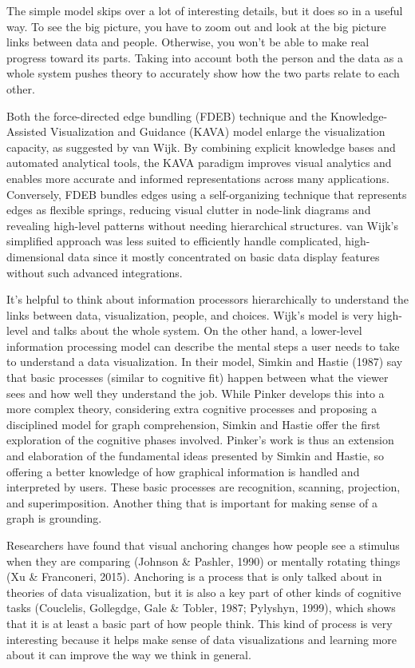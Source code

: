 \documentclass[print]{nuthesis}
\begin{document}
The simple model skips over a lot of interesting details, but it does so in a useful way.
To see the big picture, you have to zoom out and look at the big picture links between data and people.
Otherwise, you won't be able to make real progress toward its parts. Taking into account both the person and the data as a whole system pushes theory to accurately show how the two parts relate to each other.

Both the force-directed edge bundling (FDEB) technique and the Knowledge-Assisted Visualization and Guidance (KAVA) model enlarge the visualization capacity, as suggested by van Wijk.
By combining explicit knowledge bases and automated analytical tools, the KAVA paradigm improves visual analytics and enables more accurate and informed representations across many applications.
Conversely, FDEB bundles edges using a self-organizing technique that represents edges as flexible springs, reducing visual clutter in node-link diagrams and revealing high-level patterns without needing hierarchical structures.
van Wijk's simplified approach was less suited to efficiently handle complicated, high-dimensional data since it mostly concentrated on basic data display features without such advanced integrations.

It's helpful to think about information processors hierarchically to understand the links between data, visualization, people, and choices.
Wijk's model is very high-level and talks about the whole system. On the other hand, a lower-level information processing model can describe the mental steps a user needs to take to understand a data visualization.
In their model, Simkin and Hastie (1987) say that basic processes (similar to cognitive fit) happen between what the viewer sees and how well they understand the job.
While Pinker develops this into a more complex theory, considering extra cognitive processes and proposing a disciplined model for graph comprehension, Simkin and Hastie offer the first exploration of the cognitive phases involved. Pinker's work is thus an extension and elaboration of the fundamental ideas presented by Simkin and Hastie, so offering a better knowledge of how graphical information is handled and interpreted by users.
These basic processes are recognition, scanning, projection, and superimposition. Another thing that is important for making sense of a graph is grounding.

Researchers have found that visual anchoring changes how people see a stimulus when they are comparing (Johnson \& Pashler, 1990) or mentally rotating things (Xu \& Franconeri, 2015).
Anchoring is a process that is only talked about in theories of data visualization, but it is also a key part of other kinds of cognitive tasks (Couclelis, Gollegdge, Gale \& Tobler, 1987; Pylyshyn, 1999), which shows that it is at least a basic part of how people think.
This kind of process is very interesting because it helps make sense of data visualizations and learning more about it can improve the way we think in general.
\end{document}
